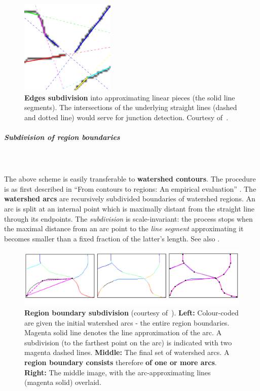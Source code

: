 \begin{figure}[t]
 \centering
 \includegraphics[width=0.4\textwidth,frame]{images/gPb-OWT-UCM/Maire2008using-contour-subdivision.png}
 \caption[Edges subdivision - an image patch]{{\bf Edges subdivision} into approximating linear pieces (the solid line segments). The intersections of the underlying straight lines (dashed and dotted line) would serve for junction detection. Courtesy of~\cite{Maire2008using}.}
 \label{fig:Maire08using-contour-subdivision}
\end{figure}

\subparagraph{Subdivision of region boundaries}\mbox{}\\\mbox{}\\
The above scheme is easily transferable to {\bf watershed contours}. The procedure is as first described in ``From contours to regions: An empirical evaluation'' \cite{Arbelaez09}. The {\bf watershed arcs} are recursively subdivided boundaries of watershed regions. An arc is split at an internal point which is maximally distant from the straight line through %
its endpoints. The {\it subdivision} is scale-invariant: the process stops when the maximal distance from an arc point to the {\it line segment} approximating it becomes smaller than a fixed fraction of the latter's %
length. See also .

\begin{figure}[t]
 \centering
 \includegraphics[width=1\textwidth]{images/gPb-OWT-UCM/Arbelaez11-contour-subdivision.png}
 \caption[Region boundary subdivision]{{\bf Region boundary subdivision} (courtesy of~\cite{Arbelaez11}). {\bf Left:} Colour-coded are given the initial watershed arcs - the entire  %
 region boundaries. Magenta solid line denotes the line approximation of the arc. A subdivision (to the farthest point on the arc) is indicated with two magenta dashed lines. {\bf Middle:} The final set of watershed arcs. A {\bf region boundary consists} therefore {\bf of one or more arcs}. {\bf Right:} The middle image, with the arc-approximating lines (magenta solid) overlaid.}
 \label{fig:Arbelaez11-contour-subdivision}
\end{figure}

